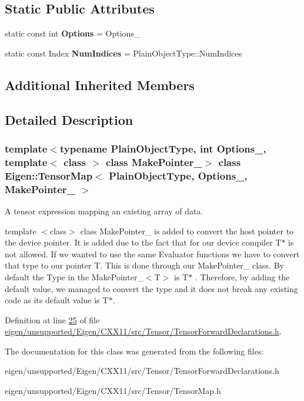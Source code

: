 \subsection*{Static Public Attributes}
\begin{DoxyCompactItemize}
\item 
\mbox{\label{class_eigen_1_1_tensor_map_ae362f56baf4769f13e8babc833a58fb4}} 
static const int {\bfseries Options} = Options\+\_\+
\item 
\mbox{\label{class_eigen_1_1_tensor_map_aa913daf2692f4eeafaad3306bddd0262}} 
static const Index {\bfseries Num\+Indices} = Plain\+Object\+Type\+::\+Num\+Indices
\end{DoxyCompactItemize}
\subsection*{Additional Inherited Members}


\subsection{Detailed Description}
\subsubsection*{template$<$typename Plain\+Object\+Type, int Options\+\_\+, template$<$ class $>$ class Make\+Pointer\+\_\+$>$\newline
class Eigen\+::\+Tensor\+Map$<$ Plain\+Object\+Type, Options\+\_\+, Make\+Pointer\+\_\+ $>$}

A tensor expression mapping an existing array of data. 

template $<$class$>$ class Make\+Pointer\+\_\+ is added to convert the host pointer to the device pointer. It is added due to the fact that for our device compiler T$\ast$ is not allowed. If we wanted to use the same Evaluator functions we have to convert that type to our pointer T. This is done through our Make\+Pointer\+\_\+ class. By default the Type in the Make\+Pointer\+\_\+$<$\+T$>$ is T$\ast$ . Therefore, by adding the default value, we managed to convert the type and it does not break any existing code as its default value is T$\ast$. 

Definition at line \hyperlink{eigen_2unsupported_2_eigen_2_c_x_x11_2src_2_tensor_2_tensor_forward_declarations_8h_source_l00025}{25} of file \hyperlink{eigen_2unsupported_2_eigen_2_c_x_x11_2src_2_tensor_2_tensor_forward_declarations_8h_source}{eigen/unsupported/\+Eigen/\+C\+X\+X11/src/\+Tensor/\+Tensor\+Forward\+Declarations.\+h}.



The documentation for this class was generated from the following files\+:\begin{DoxyCompactItemize}
\item 
eigen/unsupported/\+Eigen/\+C\+X\+X11/src/\+Tensor/\+Tensor\+Forward\+Declarations.\+h\item 
eigen/unsupported/\+Eigen/\+C\+X\+X11/src/\+Tensor/\+Tensor\+Map.\+h\end{DoxyCompactItemize}
